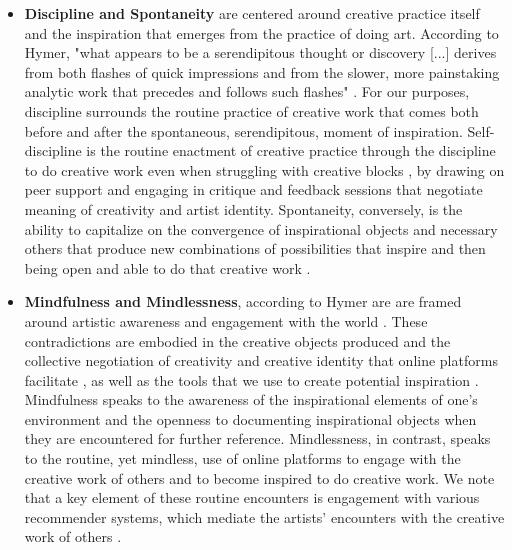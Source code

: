\begin{itemize}

\item \textbf{Discipline and Spontaneity} are centered around creative practice itself and the inspiration that emerges from the practice of doing art. According to Hymer, "what appears to be a serendipitous thought or discovery [...] derives from both flashes of quick impressions and from the slower, more painstaking analytic work that precedes and follows such flashes" \cite[~p.30]{hymer1990inspiration}. For our purposes, discipline surrounds the routine practice of creative work that comes both before and after the spontaneous, serendipitous, moment of inspiration. Self-discipline is the routine enactment of creative practice through the discipline to do creative work even when struggling with creative blocks \cite{gallay2013understanding}, by drawing on peer support \cite{wallace1987using} and engaging in critique and feedback sessions \cite{gluaveanu2014creativity} that negotiate meaning of creativity and artist identity. Spontaneity, conversely, is the ability to capitalize on the convergence of inspirational objects and necessary others that produce new combinations of possibilities that inspire \cite{derond2014structure} and then being open and able to do that creative work \cite{thrash2014psychology}. 

\item \textbf{Mindfulness and Mindlessness}, according to Hymer are are framed around artistic awareness and engagement with the world \cite{hymer1990inspiration}. These contradictions are embodied in the creative objects produced and the collective negotiation of creativity and creative identity that online platforms facilitate \cite{gluaveanu2014creativity, simpson2023rethinking}, as well as the tools that we use to create potential inspiration \cite{Rosselli2024Ideas,laing2015study,lucero2012framing}. Mindfulness speaks to the awareness of the inspirational elements of one’s environment and the openness to documenting inspirational objects when they are encountered for further reference. Mindlessness, in contrast, speaks to the routine, yet mindless, use of online platforms to engage with the creative work of others and to become inspired to do creative work. We note that a key element of these routine encounters is engagement with various recommender systems, which mediate the artists’ encounters with the creative work of others \cite{simpson2022tame}. 


\end{itemize}
